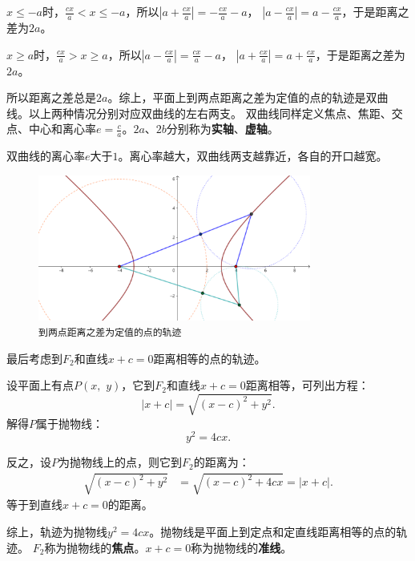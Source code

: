 \documentclass[12pt,UTF8]{ctexbook}
\theoremstyle{definition}
\theoremstyle{plain}
\begin{document}
$x \leqslant -a$时，$\frac{cx}{a} < x \leqslant -a$，所以$\left|a + \frac{cx}{a}\right| = -\frac{cx}{a} - a$，
$\left|a - \frac{cx}{a}\right| = a - \frac{cx}{a}$，于是距离之差为$2a$。

$x \geqslant a$时，$\frac{cx}{a} > x \geqslant a$，所以$\left|a - \frac{cx}{a}\right| = \frac{cx}{a} - a$，
$\left|a + \frac{cx}{a}\right| = a + \frac{cx}{a}$，于是距离之差为$2a$。

所以距离之差总是$2a$。综上，平面上到两点距离之差为定值的点的轨迹是双曲线。以上两种情况分别对应双曲线的左右两支。
双曲线同样定义焦点、焦距、交点、中心和离心率$\displaystyle e =\frac{c}{a}$。$2a$、$2b$分别称为\textbf{实轴}、\textbf{虚轴}。

双曲线的离心率$e$大于$1$。离心率越大，双曲线两支越靠近，各自的开口越宽。

\begin{figure}[h] 
    \centering
    \includegraphics[width=0.8\textwidth]{tu/双曲线第一定义.png}
    \caption*{\texttt{到两点距离之差为定值的点的轨迹}}
\end{figure}

最后考虑到$F_2$和直线$x + c = 0$距离相等的点的轨迹。

设平面上有点$P(x, \,\,y)$，它到$F_2$和直线$x + c = 0$距离相等，可列出方程：
$$ \left|x + c\right| = \sqrt{(x - c)^2 + y^2}.$$
解得$P$属于抛物线：
$$ y^2 = 4cx.$$

反之，设$P$为抛物线上的点，则它到$F_2$的距离为：
\begin{align*}
    \sqrt{(x - c)^2 + y^2} &= \sqrt{(x - c)^2 + 4cx} = |x + c|.
\end{align*}
等于到直线$x + c = 0$的距离。

综上，轨迹为抛物线$ y^2 = 4cx$。抛物线是平面上到定点和定直线距离相等的点的轨迹。
$F_2$称为抛物线的\textbf{焦点}。$x + c = 0$称为抛物线的\textbf{准线}。
\end{document}
